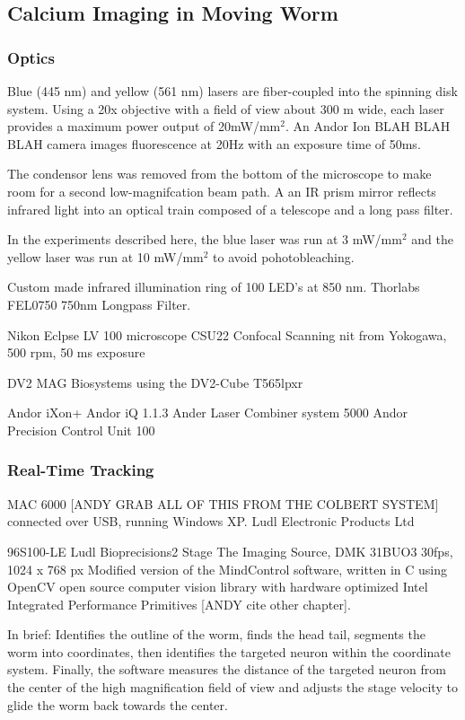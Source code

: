 \subsection{Calcium Imaging in Moving Worm}
\subsubsection{Optics}\label{sec:omegaOptics}

Blue (445 nm) and yellow (561 nm) lasers are fiber-coupled into the spinning disk system. Using a 20x objective with a field of view  about 300 \textmu m wide, each laser  provides a maximum power output of 20mW/mm$^2$. An Andor Ion BLAH BLAH BLAH camera images fluorescence at 20Hz with an exposure time of 50ms. 

The condensor lens was removed from the bottom of the microscope to make room for a second low-magnifcation beam path. A an IR prism mirror reflects infrared light into an optical train composed of a telescope and a long pass filter.  

In the experiments described here, the blue laser was run at 3 mW/mm$^2$ and the yellow laser was run at 10 mW/mm$^2$ to avoid pohotobleaching. 

Custom made infrared illumination ring of 100 LED's at 850 nm. 
Thorlabs FEL0750  750nm Longpass Filter.


Nikon Eclpse LV 100 microscope
CSU22 Confocal Scanning nit from Yokogawa, 500 rpm, 50 ms exposure

DV2 MAG Biosystems using the DV2-Cube T565lpxr

Andor iXon+
Andor iQ 1.1.3
Ander Laser Combiner system 5000
Andor Precision Control Unit 100


\subsubsection{Real-Time Tracking} \label{sec:omegaSoftware}
MAC 6000 [ANDY GRAB ALL OF THIS FROM THE COLBERT SYSTEM] connected over USB, running Windows XP.  Ludl Electronic Products Ltd

96S100-LE Ludl Bioprecisions2 Stage
The Imaging Source, DMK 31BUO3  30fps, 1024 x 768 px
Modified version of the MindControl software, written in C using OpenCV open source computer vision library with hardware optimized Intel Integrated Performance Primitives [ANDY cite other chapter]. 

In brief:
Identifies the outline of the worm, finds the head tail, segments the worm into coordinates, then identifies the targeted neuron within the coordinate system. Finally, the software measures the distance of the targeted neuron from the center of the high magnification field of view and adjusts the stage velocity to glide the worm back towards the center. 

